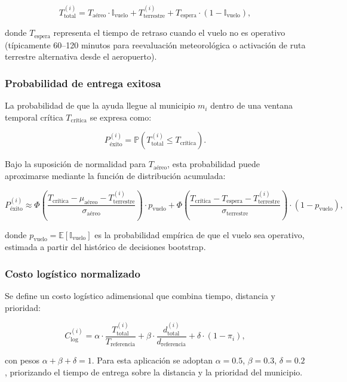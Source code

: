 \documentclass[
  spanish,
  us-letterpaper,
]{scrreprt}
\numberwithin{equation}{section}
\begin{document}
\[
T_{\text{total}}^{(i)} = T_{\text{aéreo}} \cdot \mathbb{I}_{\text{vuelo}} + T_{\text{terrestre}}^{(i)} + T_{\text{espera}} \cdot (1 - \mathbb{I}_{\text{vuelo}}),
\]

donde \(T_{\text{espera}}\) representa el tiempo de retraso cuando el
vuelo no es operativo (típicamente 60--120 minutos para reevaluación
meteorológica o activación de ruta terrestre alternativa desde el
aeropuerto).

\subsubsection{Probabilidad de entrega
exitosa}\label{probabilidad-de-entrega-exitosa}

La probabilidad de que la ayuda llegue al municipio \(m_i\) dentro de
una ventana temporal crítica \(T_{\text{crítica}}\) se expresa como:

\[
P_{\text{éxito}}^{(i)} = \mathbb{P}\left(T_{\text{total}}^{(i)} \leq T_{\text{crítica}}\right).
\]

Bajo la suposición de normalidad para \(T_{\text{aéreo}}\), esta
probabilidad puede aproximarse mediante la función de distribución
acumulada:

\[
P_{\text{éxito}}^{(i)} \approx \Phi\left(\frac{T_{\text{crítica}} - \mu_{\text{aéreo}} - T_{\text{terrestre}}^{(i)}}{\sigma_{\text{aéreo}}}\right) \cdot p_{\text{vuelo}} + \Phi\left(\frac{T_{\text{crítica}} - T_{\text{espera}} - T_{\text{terrestre}}^{(i)}}{\sigma_{\text{terrestre}}}\right) \cdot (1 - p_{\text{vuelo}}),
\]

donde \(p_{\text{vuelo}} = \mathbb{E}[\mathbb{I}_{\text{vuelo}}]\) es la
probabilidad empírica de que el vuelo sea operativo, estimada a partir
del histórico de decisiones bootstrap.

\subsubsection{Costo logístico
normalizado}\label{costo-loguxedstico-normalizado}

Se define un costo logístico adimensional que combina tiempo, distancia
y prioridad:

\[
C_{\text{log}}^{(i)} = \alpha \cdot \frac{T_{\text{total}}^{(i)}}{T_{\text{referencia}}} + \beta \cdot \frac{d_{\text{total}}^{(i)}}{d_{\text{referencia}}} + \delta \cdot (1 - \pi_i),
\]

con pesos \(\alpha + \beta + \delta = 1\). Para esta aplicación se
adoptan \(\alpha = 0.5\), \(\beta = 0.3\), \(\delta = 0.2\), priorizando
el tiempo de entrega sobre la distancia y la prioridad del municipio.
\end{document}
